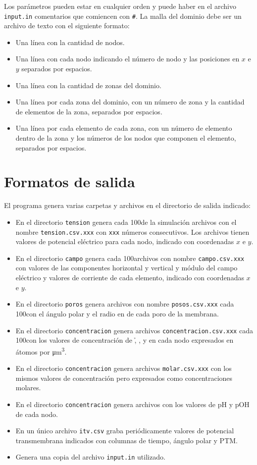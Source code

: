 Los parámetros pueden estar en cualquier orden y puede haber en el archivo \texttt{input.in} comentarios que comiencen con \texttt{\#}. La malla del dominio debe ser un archivo de texto con el siguiente formato:

\begin{itemize}
	\item Una línea con la cantidad de nodos.
	\item Una línea con cada nodo indicando el número de nodo y las posiciones en $x$ e $y$ separados por espacios.
	\item Una línea con la cantidad de zonas del dominio.
	\item Una línea por cada zona del dominio, con un número de zona y la cantidad de elementos de la zona, separados por espacios.
	\item Una línea por cada elemento de cada zona, con un número de elemento dentro de la zona y los números de los nodos que componen el elemento, separados por espacios.
\end{itemize}

\section*{Formatos de salida}

El programa genera varias carpetas y archivos en el directorio de salida indicado:

\begin{itemize}
	\item En el directorio \texttt{tension} genera cada 100\usec de la simulación archivos con el nombre \texttt{tension.csv.xxx} con \texttt{xxx} números consecutivos. Los archivos tienen valores de potencial eléctrico para cada nodo, indicado con coordenadas $x$ e $y$.
	\item En el directorio \texttt{campo} genera cada 100\usec archivos con nombre \texttt{campo.csv.xxx} con valores de las componentes horizontal y vertical y módulo del campo eléctrico y valores de corriente de cada elemento, indicado con coordenadas $x$ e $y$.
	\item En el directorio \texttt{poros} genera archivos con nombre \texttt{posos.csv.xxx} cada 100\usec con el ángulo polar y el radio en \um de cada poro de la membrana. 
	\item En el directorio \texttt{concentracion} genera archivos \texttt{concentracion.csv.xxx} cada 100\usec con los valores de concentración de \h, \oh, \na y \cl en cada nodo expresados en átomos por \si{\micro\metre\cubed}.
	\item En el directorio \texttt{concentracion} genera archivos \texttt{molar.csv.xxx} con los mismos valores de concentración pero expresados como concentraciones molares.
	\item En el directorio \texttt{concentracion} genera archivos con los valores de pH y pOH de cada nodo.
	\item En un único archivo \texttt{itv.csv} graba periódicamente valores de potencial transmembrana indicados con columnas de tiempo, ángulo polar y PTM.
	\item Genera una copia del archivo \texttt{input.in} utilizado.
\end{itemize}

